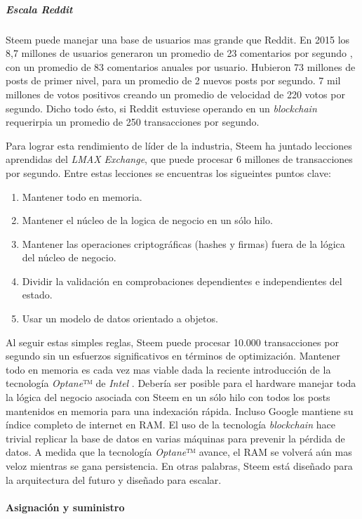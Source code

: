 \documentclass[a4paper,titlepage,final]{article}
\begin{document}
\subparagraph{Escala Reddit}

Steem puede manejar una base de usuarios mas grande que Reddit. En 2015 los 8,7 millones de usuarios generaron un promedio de 23 comentarios por segundo \cite{13}, con un promedio de 83 comentarios anuales por usuario. Hubieron 73 millones de posts de primer nivel, para un promedio de 2 nuevos posts por segundo. 7 mil millones de votos positivos creando un promedio de velocidad de 220 votos por segundo. Dicho todo ésto, si Reddit estuviese operando en un \textit{blockchain} requerirpia un promedio de 250 transacciones por segundo.

Para lograr esta rendimiento de líder de la industria, Steem ha juntado lecciones aprendidas del \textit{LMAX Exchange}\cite{14}, que puede procesar 6 millones de transacciones por segundo. Entre estas lecciones se encuentras los sigueintes puntos clave:

\begin{enumerate}
\item Mantener todo en memoria.
\item Mantener el núcleo de la logica de negocio en un sólo hilo.
\item Mantener las operaciones criptográficas (hashes y firmas) fuera de la lógica del núcleo de negocio.
\item Dividir la validación en comprobaciones dependientes e independientes del estado.
\item Usar un modelo de datos orientado a objetos.
\end{enumerate}

Al seguir estas simples reglas, Steem puede procesar 10.000 transacciones por segundo sin un esfuerzos significativos en términos de optimización. Mantener todo en memoria es cada vez mas viable dada la reciente introducción de la tecnología \textit{Optane}™ de \textit{Intel} \cite{15}. Debería ser posible para el hardware manejar toda la lógica del negocio asociada con Steem en un sólo hilo con todos los posts mantenidos en memoria para una indexación rápida. Incluso Google mantiene su índice completo de internet en RAM. El uso de la tecnología \textit{blockchain} hace trivial replicar la base de datos en varias máquinas para prevenir la pérdida de datos. A medida que la tecnología \textit{Optane}™ avance, el RAM se volverá aún mas veloz mientras se gana persistencia. En otras palabras, Steem está diseñado para la arquitectura del futuro y diseñado para escalar.

\paragraph{Asignación y suministro}
\end{document}
